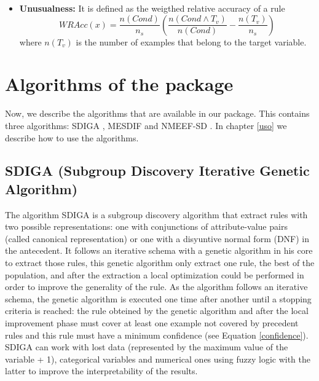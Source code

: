 \documentclass[]{article}
\begin{document}
\begin{itemize}
  \item \textbf{Unusualness:} It is defined as the weigthed relative accuracy of a rule \begin{equation} WRAcc(x) = \frac{n(Cond)}{n_s}(\frac{n(Cond \wedge T_v)}{n(Cond)} - \frac{n(T_v)}{n_s})\label{Unusualness} \end{equation} where $n(T_v)$ is the number of examples that belong to the target variable.
  
\end{itemize}

\section{Algorithms of the package}\label{algorithms-of-the-package}

Now, we describe the algorithms that are available in our package. This
contains three algorithms: SDIGA \cite{sdiga}, MESDIF \cite{mesdif} and
NMEEF-SD \cite{nmeef}. In chapter \ref{uso} we describe how to use the
algorithms.

\subsection{SDIGA (Subgroup Discovery Iterative Genetic
Algorithm)}\label{sdiga-subgroup-discovery-iterative-genetic-algorithm}

The algorithm SDIGA is a subgroup discovery algorithm that extract rules
with two possible representations: one with conjunctions of
attribute-value pairs (called canonical representation) or one with a
disyuntive normal form (DNF) in the antecedent. It follows an iterative
schema with a genetic algorithm in his core to extract those rules, this
genetic algorithm only extract one rule, the best of the population, and
after the extraction a local optimization could be performed in order to
improve the generality of the rule. As the algorithm follows an
iterative schema, the genetic algorithm is executed one time after
another until a stopping criteria is reached: the rule obteined by the
genetic algorithm and after the local improvement phase must cover at
least one example not covered by precedent rules and this rule must have
a minimum confidence (see Equation \ref{confidence}).\\SDIGA can work
with lost data (represented by the maximum value of the variable + 1),
categorical variables and numerical ones using fuzzy logic with the
latter to improve the interpretability of the results.
\end{document}
